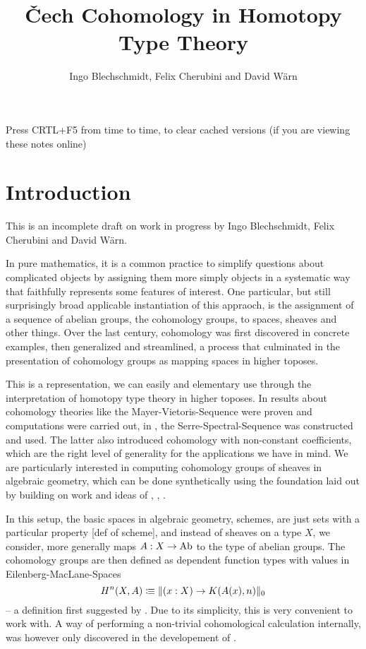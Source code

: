 \documentclass{../util/zariski}
\title{\v{C}ech Cohomology in Homotopy Type Theory}
\author{Ingo Blechschmidt, Felix Cherubini and David Wärn}
\begin{document}
\maketitle

\begin{center}
  \large{Press CRTL+F5 from time to time, to clear cached versions}
  \large{(if you are viewing these notes online)}
\end{center}

\tableofcontents

\section*{Introduction}
This is an incomplete draft on work in progress by Ingo Blechschmidt, Felix Cherubini and David Wärn.

In pure mathematics,
it is a common practice to simplify questions about complicated objects
by assigning them more simply objects in a systematic way that faithfully represents some features of interest.
One particular, but still surprisingly broad applicable instantiation of this appraoch,
is the assignment of a sequence of abelian groups, the cohomology groups, to spaces, sheaves and other things.
Over the last century, cohomology was first discovered in concrete examples, then generalized and streamlined,
a process that culminated in the presentation of cohomology groups as mapping spaces in higher toposes.

This is a representation, we can easily and elementary use through the interpretation of homotopy type theory in higher toposes.
In \cite{evan} results about cohomology theories like the Mayer-Vietoris-Sequence were proven and computations were carried out,
in \cite{floris}, the Serre-Spectral-Sequence was constructed and used.
The latter also introduced cohomology with non-constant coefficients,
which are the right level of generality for the applications we have in mind.
We are particularly interested in computing cohomology groups of sheaves in algebraic geometry,
which can be done synthetically using the foundation laid out by \cite{draft}
building on work and ideas of \cite{ingo-thesis}, \cite{kock-sdg}, \cite{david-myers}.

In this setup, the basic spaces in algebraic geometry, schemes, are just sets with a particular property \cite{draft}[def of scheme],
and instead of sheaves on a type $X$, we consider, more generally maps $A:X\to\operatorname{Ab}$ to the type of abelian groups.
The cohomology groups are then defined as dependent function types with values in Eilenberg-MacLane-Spaces
\[ H^n(X,A)\vcentcolon\mspace{-1.2mu}\equiv \|(x:X)\to K(A(x),n)\|_0\]
-- a definition first suggested by \cite{mikes-blogpost}.
Due to its simplicity, this is very convenient to work with.
A way of performing a non-trivial cohomological calculation internally,
was however only discovered in the developement of \cite{draft}.
\end{document}
